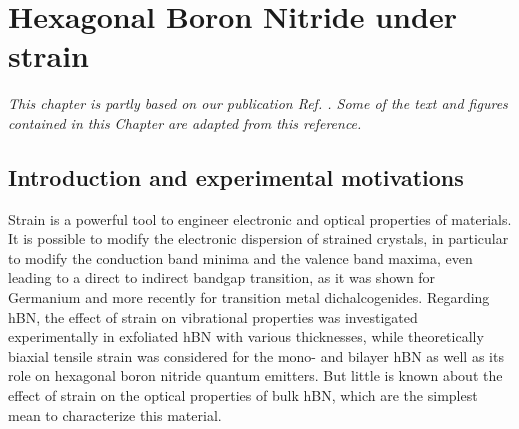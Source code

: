 \chapter{Hexagonal Boron Nitride under strain} \label{chap:strain}
\textit{This chapter is partly based on our publication Ref. \cite{lechifflart2022excitons}. Some of the text and figures contained in this Chapter are adapted from this reference.}

\chaptertoc{}

%
\section{Introduction and experimental motivations}
Strain is a powerful tool to engineer electronic and optical properties of materials. It is possible to modify the electronic dispersion of strained crystals, in particular to modify the conduction band minima and the valence band maxima, even leading to a direct to indirect bandgap transition, as it was shown for Germanium \cite{hoshina2009first,cheng2010strain} and more recently for transition metal dichalcogenides.\cite{desai2014strain,choudhary2020shear,frisenda2017biaxial} Regarding hBN, the effect of strain on vibrational properties was investigated experimentally in exfoliated hBN with various thicknesses,\cite{androulidakis2018strained} while theoretically biaxial tensile strain was considered for the mono- and bilayer \acrshort{hBN} \cite{yang2013distorted,fujimoto2016band} as well as its role on hexagonal boron nitride quantum emitters.\cite{tabesh2021strain} But little is known about the effect of strain on the optical properties of bulk hBN, which are the simplest mean to characterize this material. 

